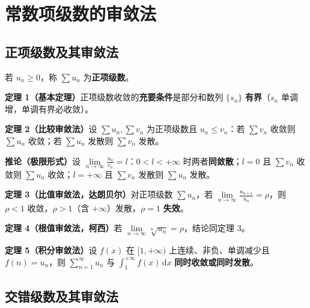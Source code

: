 
\section{常数项级数的审敛法}
\subsection{正项级数及其审敛法}

若 $u_n\ge0$，称 $\sum u_n$ 为\textbf{正项级数}。

\textbf{定理 1（基本定理）}\quad 正项级数收敛的\textbf{充要条件}是部分和数列 $\{s_n\}$ \textbf{有界}（$s_n$ 单调增，单调有界必收敛）。

\textbf{定理 2（比较审敛法）}\quad 设 $\sum u_n,\sum v_n$ 为正项级数且 $u_n\le v_n$：若 $\sum v_n$ 收敛则 $\sum u_n$ 收敛；若 $\sum u_n$ 发散则 $\sum v_n$ 发散。

\textbf{推论（极限形式）}\quad 设 $\lim\limits_{n\to\infty}\frac{u_n}{v_n}=l$：$0<l<+\infty$ 时两者\textbf{同敛散}；$l=0$ 且 $\sum v_n$ 收敛则 $\sum u_n$ 收敛；$l=+\infty$ 且 $\sum v_n$ 发散则 $\sum u_n$ 发散。

\textbf{定理 3（比值审敛法，达朗贝尔）}\quad 对正项级数 $\sum u_n$，若 $\lim\limits_{n\to\infty}\frac{u_{n+1}}{u_n}=\rho$，则 $\rho<1$ 收敛，$\rho>1$（含 $+\infty$）发散，$\rho=1$ \textbf{失效}。

\textbf{定理 4（根值审敛法，柯西）}\quad 若 $\lim\limits_{n\to\infty}\sqrt[n]{u_n}=\rho$，结论同定理 3。

\textbf{定理 5（积分审敛法）}\quad 设 $f(x)$ 在 $[1,+\infty)$ 上连续、非负、单调减少且 $f(n)=u_n$，则 $\sum\limits_{n=1}^{\infty}u_n$ 与 $\int_1^{+\infty}f(x)\,\mathrm{d}x$ \textbf{同时收敛或同时发散}。


\subsection{交错级数及其审敛法}

